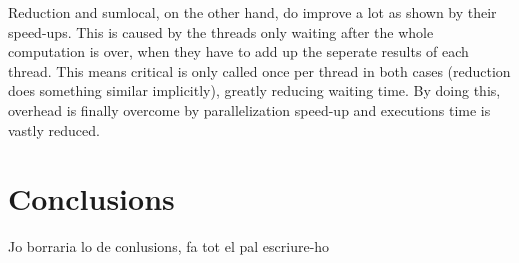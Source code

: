 \documentclass[12]{article}
\begin{document}
Reduction and sumlocal, on the other hand, do improve a lot as shown by their speed-ups. This is caused by the threads only waiting after the whole computation is over, when they have to add up the seperate results of each thread. This means critical is only called once per thread in both cases (reduction does something similar implicitly), greatly reducing waiting time. By doing this, overhead is finally overcome by parallelization speed-up and executions time is vastly reduced.

\section{Conclusions}
Jo borraria lo de conlusions, fa tot el pal escriure-ho
\end{document}
